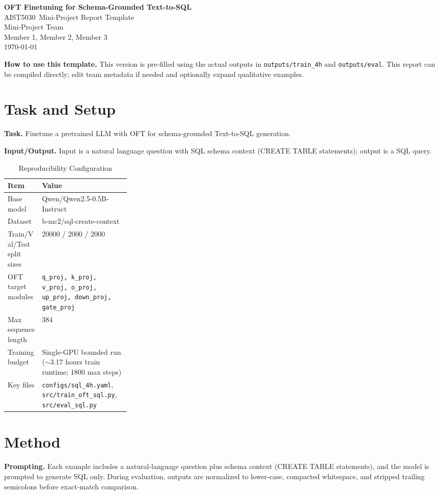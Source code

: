 \documentclass[11pt]{article}
\newcommand{\projecttitle}{OFT Finetuning for Schema-Grounded Text-to-SQL}
\newcommand{\coursename}{AIST5030}
\newcommand{\teamname}{Mini-Project Team}
\newcommand{\memberlist}{Member 1, Member 2, Member 3}
\newcommand{\modelname}{Qwen/Qwen2.5-0.5B-Instruct}
\newcommand{\datasetname}{b-mc2/sql-create-context}
\begin{document}
\begin{center}
    {\LARGE \textbf{\projecttitle}}\\[0.5em]
    {\large \coursename\ Mini-Project Report Template}\\[0.5em]
    \teamname\\
    \memberlist\\
    \today
\end{center}

\vspace{0.5em}
\noindent\textbf{How to use this template.}
This version is pre-filled using the actual outputs in \texttt{outputs/train\_4h} and \texttt{outputs/eval}.
This report can be compiled directly; edit team metadata if needed and optionally expand qualitative examples.

\section{Task and Setup}
\textbf{Task.}
Finetune a pretrained LLM with OFT for schema-grounded Text-to-SQL generation.

\textbf{Input/Output.}
Input is a natural language question with SQL schema context (CREATE TABLE statements);
output is a SQL query.

\begin{table}[H]
    \centering
    \caption{Reproducibility Configuration}
    \begin{tabularx}{\linewidth}{>{\raggedright\arraybackslash}p{0.28\linewidth}X}
        \toprule
        Item & Value \\
        \midrule
        Base model & \modelname \\
        Dataset & \datasetname \\
        Train/Val/Test split sizes & 20000 / 2000 / 2000 \\
        OFT target modules & \texttt{q\_proj, k\_proj, v\_proj, o\_proj, up\_proj, down\_proj, gate\_proj} \\
        Max sequence length & 384 \\
        Training budget & Single-GPU bounded run (\(\sim\)3.17 hours train runtime; 1800 max steps) \\
        Key files & \texttt{configs/sql\_4h.yaml}, \texttt{src/train\_oft\_sql.py}, \texttt{src/eval\_sql.py} \\
        \bottomrule
    \end{tabularx}
\end{table}

\section{Method}
\textbf{Prompting.}
Each example includes a natural-language question plus schema context (CREATE TABLE statements),
and the model is prompted to generate SQL only. During evaluation, outputs are normalized to lower-case,
compacted whitespace, and stripped trailing semicolons before exact-match comparison.
\end{document}
